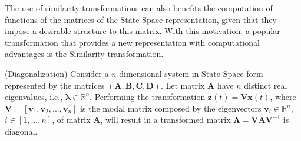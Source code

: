 \documentclass[a4paper,11pt]{book}
\numberwithin{figure}{chapter}
\numberwithin{equation}{chapter}
\numberwithin{table}{chapter}
\newtheorem{theorem}{Theorem}[chapter]
\theoremstyle{definition}
\newcounter{boxed-theorem}
\newenvironment{boxed-theorem}[1]
{\colorlet{shadecolor}{pastelBlue2!10} \begin{shaded} \begin{theorem}{#1}}
{\end{theorem} \end{shaded}}
\newcounter{boxed-definition}
\newcounter{boxed-example}
\begin{document}
The use of similarity transformations can also benefits the computation of functions of the matrices of the State-Space representation, given that they impose a desirable structure to this matrix. With this motivation, a popular transformation that provides a new representation with computational advantages is the Similarity transformation.

\begin{boxed-theorem}{(Diagonalization)}
    Consider a $n$-dimensional system in State-Space form represented by the matrices $(\bm{A}, \bm{B}, \bm{C}, \bm{D})$. Let matrix $\bm{A}$ have $n$ distinct real eigenvalues, i.e., $\bm{\lambda} \in \mathbb{R}^n$. Performing the transformation $\bm{z}(t) = \bm{V} \bm{x}(t)$, where $\bm{V} = [\bm{v}_1, \bm{v}_2, ..., \bm{v}_n]$ is the modal matrix composed by the eigenvectors $\bm{v}_i \in \mathbb{R}^n$, $i \in [1, ..., n]$, of matrix $\bm{A}$, will result in a transformed matrix $\bm{\Lambda} = \bm{V} \bm{A} \bm{V}^{-1}$ is diagonal.
\end{boxed-theorem} 
\end{document}

